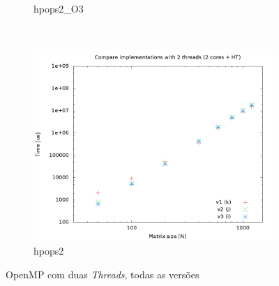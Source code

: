 \documentclass[a4paper, 12pt]{article}
\begin{document}
\begin{figure}[H]
\begin{subfigure}[H]{0.5\textwidth}
        \caption{hpops2\_O3}
        \label{fig:hpops2_O3_cmp_2t}
    \end{subfigure}
    ~ %
    \begin{subfigure}[H]{0.5\textwidth}
        \includegraphics[width=\textwidth]{hpops2_cmp_versions-2t}
        \caption{hpops2}
        \label{fig:hpops2_cmp_2t}
    \end{subfigure}%
    \caption{OpenMP com duas \textit{Threads}, todas as versões}\label{fig:animals}
\end{figure}

\newpage
\end{document}

